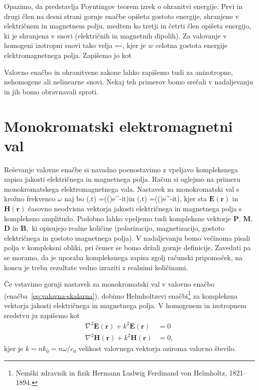 Opazimo, da predstavlja Poyntingov teorem
izrek o ohranitvi energije. Prvi in drugi člen na desni strani gornje
enačbe opišeta gostoto energije, shranjene v električnem in magnetnem
polju, medtem ko tretji in četrti člen opišeta energijo,
ki je shranjena v snovi (električnih in magnetnih dipolih). Za valovanje
v homogeni izotropni snovi tako velja
\beq
\nabla\cdot{}=-,
\eeq
kjer je $w$ celotna
gostota energije elektromagnetnega polja. Zapišemo jo kot 

Valovno enačbo in ohranitvene zakone lahko zapišemo tudi za anizotropne,
nehomogene ali nelinearne snovi. Nekaj teh primerov bomo srečali v nadaljevanju
in jih bomo obravnavali sproti.

\section{Monokromatski elektromagnetni val}

Reševanje valovne enačbe si navadno poenostavimo z vpeljavo kompleksnega
zapisa jakosti električnega in magnetnega polja. Račun si
oglejmo na primeru monokromatskega elektromagnetnega vala. Nastavek
za monokromatski val s krožno frekvenco $\omega$ naj bo
\beq
{}(,t)  =\mathfrak{\Re}(()e^{-i\omega t})\qquad \textrm{in} \qquad
{}(,t)  =\mathfrak{\Re}(()e^{-i\omega t}),
\eeq
kjer sta $\mathbf E(\mathbf{r})$ in $\mathbf H(\mathbf{r})$ časovno
neodvisna vektorja jakosti električnega in 
magnetnega polja s kompleksno
amplitudo. Podobno lahko vpeljemo tudi kompleksne vektorje $\mathbf{P}$,
$\mathbf{M}$, $\mathbf{D}$ in $\mathbf{B},$ ki opisujejo realne količine (polarizacijo,
magnetizacijo, gostoto električnega in gostoto magnetnega polja).
V nadaljevanju bomo večinoma pisali polja v kompleksni obliki, pri
čemer se bomo držali gornje definicije. Zavedati pa se moramo, da
je uporaba kompleksnega zapisa zgolj računski pripomoček, na koncu
je treba rezultate vedno izraziti z realnimi količinami. 

Če vstavimo gornji nastavek za monokromatski val v valovno enačbo
(enačba~\ref{eq:valovna-skalarna}), dobimo Helmholtzevi
enačbi\footnote{Nemški zdravnik in fizik Hermann Ludwig Ferdinand von Helmholtz, 1821--1894.} 
za kompleksna vektorja jakosti električnega in magnetnega polja.
V homogenem in izotropnem sredstvu ju zapišemo kot
\begin{align}
\nabla^{2}\mathbf{E}(\mathbf{r})+k^{2}\mathbf{E}(\mathbf{r}) &=0\label{eq:Helmholtz}\\
\nabla^{2}\mathbf{H}(\mathbf{r})+k^{2}\mathbf{H}(\mathbf{r}) &=0,
\end{align}
kjer je $k=nk_{0}=n\omega/c_{0}$ velikost valovnega vektorja oziroma
valovno število. 

